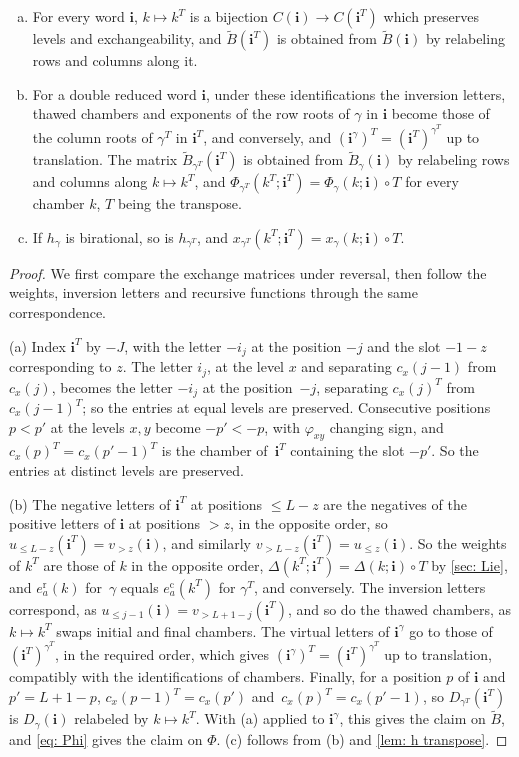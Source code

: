 \documentclass[a4paper]{amsart}
\numberwithin{equation}{section}
\theoremstyle{definition}
\theoremstyle{remark}
\newcommand{\bfi}{\mathbf{i}}
\newcommand{\tB}{\widetilde{B}}
\newcommand{\rr}{\mathrm{r}}
\newcommand{\cc}{\mathrm{c}}
\begin{document}
\begin{lemma}
  \label{lem: mirror}
  \begin{enumerate}[(a)]
    \item For every word $\bfi$, $k\mapsto k^T$ is a bijection $C(\bfi)\to C(\bfi^T)$ which preserves levels and exchangeability, and $\tB(\bfi^T)$ is obtained from $\tB(\bfi)$ by relabeling rows and columns along it.
    \item For a double reduced word $\bfi$, under these identifications the inversion letters, thawed chambers and exponents of the row roots of $\gamma$ in $\bfi$ become those of the column roots of $\gamma^T$ in $\bfi^T$, and conversely, and $(\bfi^\gamma)^T=(\bfi^T)^{\gamma^T}$ up to translation.
      The matrix $\tB_{\gamma^T}(\bfi^T)$ is obtained from $\tB_\gamma(\bfi)$ by relabeling rows and columns along $k\mapsto k^T$, and $\Phi_{\gamma^T}(k^T;\bfi^T)=\Phi_\gamma(k;\bfi)\circ T$ for every chamber $k$, $T$ being the transpose.
    \item If $h_\gamma$ is birational, so is $h_{\gamma^T}$, and $x_{\gamma^T}(k^T;\bfi^T)=x_\gamma(k;\bfi)\circ T$.
  \end{enumerate}
\end{lemma}
\begin{proof}
  We first compare the exchange matrices under reversal, then follow the weights, inversion letters and recursive functions through the same correspondence.

  (a) Index $\bfi^T$ by $-J$, with the letter $-i_j$ at the position $-j$ and the slot $-1-z$ corresponding to $z$.
  The letter $i_j$, at the level $x$ and separating $c_x(j-1)$ from $c_x(j)$, becomes the letter $-i_j$ at the position~$-j$, separating $c_x(j)^T$ from $c_x(j-1)^T$; so the entries at equal levels are preserved.
  Consecutive positions~$p<p'$ at the levels $x,y$ become $-p'<-p$, with $\varphi_{xy}$ changing sign, and $c_x(p)^T=c_x(p'-1)^T$ is the chamber of~$\bfi^T$ containing the slot $-p'$.
  So the entries at distinct levels are preserved.

  (b) The negative letters of $\bfi^T$ at positions $\le L-z$ are the negatives of the positive letters of $\bfi$ at positions $>z$, in the opposite order, so $u_{\le L-z}(\bfi^T)=v_{>z}(\bfi)$, and similarly $v_{>L-z}(\bfi^T)=u_{\le z}(\bfi)$.
  So the weights of $k^T$ are those of $k$ in the opposite order, $\Delta(k^T;\bfi^T)=\Delta(k;\bfi)\circ T$ by \cref{sec: Lie}, and $e^\rr_a(k)$ for~$\gamma$ equals $e^\cc_a(k^T)$ for $\gamma^T$, and conversely.
  The inversion letters correspond, as $u_{\le j-1}(\bfi)=v_{>L+1-j}(\bfi^T)$, and so do the thawed chambers, as $k\mapsto k^T$ swaps initial and final chambers.
  The virtual letters of $\bfi^\gamma$ go to those of $(\bfi^T)^{\gamma^T}$, in the required order, which gives $(\bfi^\gamma)^T=(\bfi^T)^{\gamma^T}$ up to translation, compatibly with the identifications of chambers.
  Finally, for a position $p$ of $\bfi$ and $p'=L+1-p$, $c_x(p-1)^T=c_x(p')$ and~$c_x(p)^T=c_x(p'-1)$, so $D_{\gamma^T}(\bfi^T)$ is $D_\gamma(\bfi)$ relabeled by $k\mapsto k^T$.
  With (a) applied to $\bfi^\gamma$, this gives the claim on $\tB$, and \eqref{eq: Phi} gives the claim on $\Phi$. (c) follows from (b) and \cref{lem: h transpose}.
\end{proof}
\end{document}
